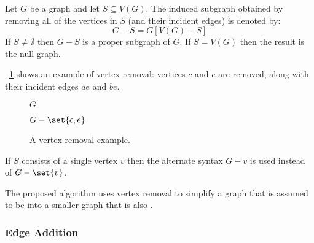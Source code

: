 Let \(G\) be a graph and let \(S\subseteq V(G)\).  The induced subgraph obtained by removing all of the vertices in
\(S\) (and their incident edges) is denoted by:
\[G-S=G[V(G)-S]\]
If \(S\ne\emptyset\) then \(G-S\) is a proper subgraph of \(G\).  If \(S=V(G)\) then the result is the null graph.

\figurename~\ref{fig:vremove} shows an example of vertex removal: vertices \(c\) and \(e\) are removed, along with
their incident edges \(ae\) and \(be\).

\begin{figure}[H]
  \begin{minipage}{2.75in}
    \centering

    \(G\)
  \end{minipage}
  \begin{minipage}{3in}
    \centering

    \(G-\set{c,e}\)
  \end{minipage}
  \caption{A vertex removal example.}
  \label{fig:vremove}
\end{figure}

If \(S\) consists of a single vertex \(v\) then the alternate syntax \(G-v\) is used instead of \(G-\set{v}\).

The proposed algorithm uses vertex removal to simplify a graph that is assumed to be  into a smaller
graph that is also .

\subsubsection{Edge Addition}\label{sec:sub:sub:eadd}

